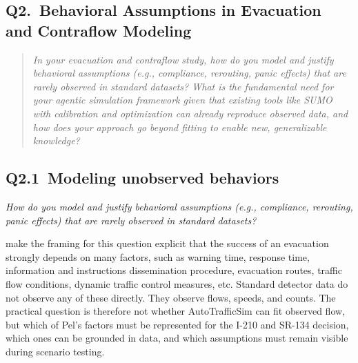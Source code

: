 \fi

\begin{bibunit}[plainnat]

\section{Q2.\ Behavioral Assumptions in Evacuation and Contraflow Modeling}

\begin{quote}\itshape
In your evacuation and contraflow study, how do you model and justify behavioral assumptions (e.g., compliance, rerouting, panic effects) that are rarely observed in standard datasets? What is the fundamental need for your agentic simulation framework given that existing tools like SUMO with calibration and optimization can already reproduce observed data, and how does your approach go beyond fitting to enable new, generalizable knowledge?
\end{quote}

\subsection{Q2.1\ Modeling unobserved behaviors}

\textit{How do you model and justify behavioral assumptions (e.g., compliance, rerouting, panic effects) that are rarely observed in standard datasets?}

\citet{pel2012evacuationbehavior} make the framing for this question
explicit that the success of an evacuation strongly depends on many factors,
such as warning time, response time, information and instructions
dissemination procedure, evacuation routes, traffic flow conditions,
dynamic traffic control measures, etc. Standard detector data do not
observe any of these directly. They observe flows, speeds, and counts. The
practical question is therefore not whether AutoTrafficSim can fit observed
flow, but which of Pel's factors must be represented for the I-210 and
SR-134 decision, which ones can be grounded in data, and which assumptions
must remain visible during scenario testing.


\end{bibunit}
